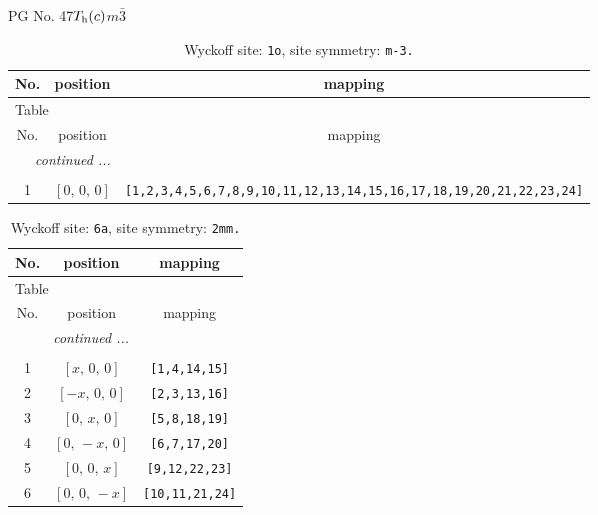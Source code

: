 \documentclass[fleqn,8pt]{jsarticle}
\begin{document}
\setcounter{MaxMatrixCols}{32}

\renewcommand{\tablename}{Table~}
\renewcommand{\figurename}{Figure~}
\begin{center}
\LARGE
PG No. 47\quad$T_{\rm h}(c)$\quad$m\bar{3}$\quad[ cubic ]
\end{center}
\renewcommand{\arraystretch}{1.2}
\begin{longtable}{ccc}
\caption{Wyckoff site: {\tt 1o}, site symmetry: {\tt m-3.}}
 \\
 \hline \hline
No. & position & mapping \\ \hline \endfirsthead

\multicolumn{2}{l}{\tablename\ \thetable{}} \\
 \hline \hline
No. & position & mapping \\ \hline \endhead

 \hline \hline
\multicolumn{2}{r}{\footnotesize\it continued ...} \\ \endfoot

 \hline \hline
\multicolumn{2}{r}{} \\ \endlastfoot

1 & $\left[ 0,\, 0,\, 0 \right]$ & {\tt [1,2,3,4,5,6,7,8,9,10,11,12,13,14,15,16,17,18,19,20,21,22,23,24]} \\
\end{longtable}
\renewcommand{\arraystretch}{1.2}
\begin{longtable}{ccc}
\caption{Wyckoff site: {\tt 6a}, site symmetry: {\tt 2mm.}}
 \\
 \hline \hline
No. & position & mapping \\ \hline \endfirsthead

\multicolumn{2}{l}{\tablename\ \thetable{}} \\
 \hline \hline
No. & position & mapping \\ \hline \endhead

 \hline \hline
\multicolumn{2}{r}{\footnotesize\it continued ...} \\ \endfoot

 \hline \hline
\multicolumn{2}{r}{} \\ \endlastfoot

1 & $\left[ x,\, 0,\, 0 \right]$ & {\tt [1,4,14,15]} \\ \hline
2 & $\left[ - x,\, 0,\, 0 \right]$ & {\tt [2,3,13,16]} \\ \hline
3 & $\left[ 0,\, x,\, 0 \right]$ & {\tt [5,8,18,19]} \\ \hline
4 & $\left[ 0,\, - x,\, 0 \right]$ & {\tt [6,7,17,20]} \\ \hline
5 & $\left[ 0,\, 0,\, x \right]$ & {\tt [9,12,22,23]} \\ \hline
6 & $\left[ 0,\, 0,\, - x \right]$ & {\tt [10,11,21,24]} \\
\end{longtable}
\end{document}
